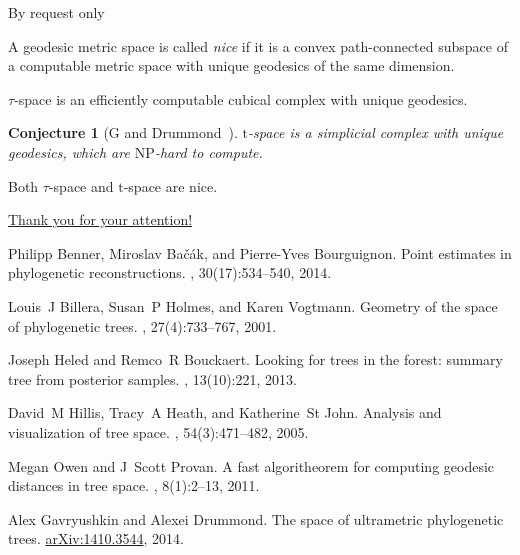 \documentclass{beamer}
\newtheorem{conjecture}{Conjecture}
\renewcommand{\t}{$\mathrm{t}$}
\newcommand{\NP}{$\mathrm{NP}$}
\begin{document}
\begin{frame}{By request only}
\begin{definition}
A geodesic metric space is called {\em nice} if it is a convex path-connected subspace of a computable metric space with unique geodesics of the same dimension. 
\end{definition}

\begin{theorem}
$\tau$-space is an efficiently computable cubical complex with unique geodesics. 
\end{theorem}

\begin{conjecture}[G and Drummond~\cite{Gavruskin2015}]
\t-space is a simplicial complex with unique geodesics, which are \NP-hard to compute. 
\end{conjecture}

\begin{corollary}
Both $\tau$-space and \t-space are nice.
\end{corollary}
\end{frame}



\begin{frame}{\href{http://alex.gavruskin.com/pictures/}{\Large{Thank you for your attention!}}}

\scriptsize

Philipp Benner, Miroslav Ba{\v{c}}{\'a}k, and Pierre-Yves Bourguignon.
\newblock Point estimates in phylogenetic reconstructions.
, 30(17):534--540, 2014.

Louis~J Billera, Susan~P Holmes, and Karen Vogtmann.
\newblock Geometry of the space of phylogenetic trees.
, 27(4):733--767, 2001.

Joseph Heled and Remco~R Bouckaert.
\newblock Looking for trees in the forest: summary tree from posterior samples.
, 13(10):221, 2013.

David~M Hillis, Tracy~A Heath, and Katherine~St John.
\newblock Analysis and visualization of tree space.
, 54(3):471--482, 2005.

Megan Owen and J~Scott Provan.
\newblock A fast algoritheorem for computing geodesic distances in tree space.
, 8(1):2--13, 2011.

 Alex Gavryushkin and Alexei Drummond. 
\newblock The space of ultrametric phylogenetic trees. 
 \href{http://arxiv.org/abs/1410.3544}{arXiv:1410.3544}, 2014.
\end{frame}
\end{document}
